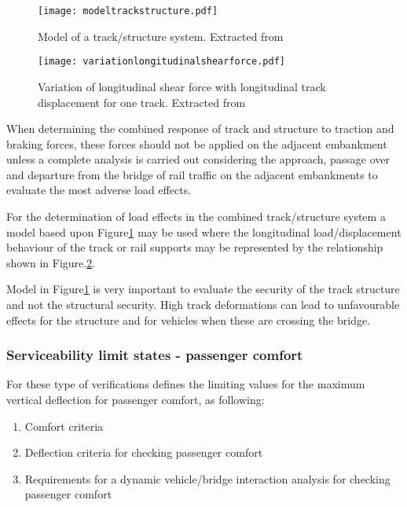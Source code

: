 \begin{figure}[p]
	\centering
	\texttt{[image: modeltrackstructure.pdf]}
	\caption{Model of a track/structure system. Extracted from \cite[Figure 6.19]{EC12}}
	\label{fig:modeltrackstructure}
\end{figure}

\begin{figure}[p]
	\centering
	\texttt{[image: variationlongitudinalshearforce.pdf]}
	\caption{Variation of longitudinal shear force with longitudinal track displacement for one track. Extracted from \cite[Figure 6.20]{EC12}}
	\label{fig:variationlongitudinalshearforce}
\end{figure}

When determining the combined response of track and structure to traction and braking forces, these forces should not be applied on the adjacent embankment unless a complete analysis is carried out considering the approach, passage over and departure from the bridge of rail traffic on the adjacent embankments to evaluate the most adverse load effects.

For the determination of load effects in the combined track/structure system a model based upon Figure\ref{fig:modeltrackstructure} may be used where the longitudinal load/displacement behaviour of the track or rail supports may be represented by the relationship shown in Figure.\ref{fig:variationlongitudinalshearforce}.

Model in Figure\ref{fig:modeltrackstructure} is very important to evaluate the security of the track structure and not the structural security. High track deformations can lead to unfavourable effects for the structure and for vehicles when these are crossing the bridge.

\subsubsection{Serviceability limit states - passenger comfort}

For these type of verifications \cite{1990a2} defines the limiting values for the maximum vertical deflection for passenger comfort, as following:

\begin{enumerate}
	\item Comfort criteria
	\item Deflection criteria for checking passenger comfort
	\item Requirements for a dynamic vehicle/bridge interaction analysis for checking passenger comfort
\end{enumerate}

